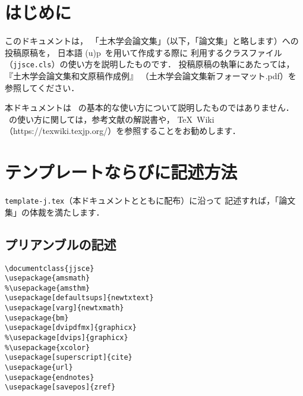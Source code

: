 \documentclass{jjsce}%
\def\ClassFile{\texttt{jjsce.cls}}
\begin{document}
\section{はじめに}

このドキュメントは，
「土木学会論文集」（以下，「論文集」と略します）への投稿原稿を，
日本語 (u)p\LaTeXe\ を用いて作成する際に
利用するクラスファイル（\ClassFile{}）の使い方を説明したものです．
投稿原稿の執筆にあたっては，
『土木学会論文集和文原稿作成例』
（土木学会論文集新フォーマット.pdf）を参照してください．

本ドキュメントは \LaTeXe\ の基本的な使い方について説明したものではありません．
\LaTeXe\ の使い方に関しては，参考文献の解説書\cite{Okumura}や，
\TeX\ Wiki（https://texwiki.texjp.org/）を参照することをお勧めします．

\section{テンプレートならびに記述方法}%

\texttt{template-j.tex}（本ドキュメントとともに配布）に沿って
記述すれば，「論文集」の体裁を満たします．

\subsection{プリアンブルの記述}

\begin{verbatim}
\documentclass{jjsce}
\usepackage{amsmath}
%\usepackage{amsthm}
\usepackage[defaultsups]{newtxtext}
\usepackage[varg]{newtxmath}
\usepackage{bm}
\usepackage[dvipdfmx]{graphicx}
%\usepackage[dvips]{graphicx}
%\usepackage{xcolor}
\usepackage[superscript]{cite}
\usepackage{url}
\usepackage{endnotes}
\usepackage[savepos]{zref}
\end{verbatim}
\end{document}
